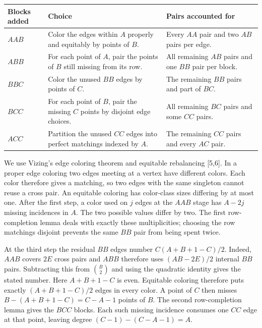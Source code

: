 \documentclass[english,11pt,a4paper]{article}
\begin{document}
{\begin{longtable}[]{@{}
  >{\raggedright\arraybackslash}p{}
  >{\raggedright\arraybackslash}p{}
  >{\raggedright\arraybackslash}p{}@{}}
\toprule\noalign{}
\begin{minipage}[b]{\linewidth}\raggedright
Blocks added
\end{minipage} & \begin{minipage}[b]{\linewidth}\raggedright
Choice
\end{minipage} & \begin{minipage}[b]{\linewidth}\raggedright
Pairs accounted for
\end{minipage} \\
\midrule\noalign{}
\endhead
\bottomrule\noalign{}
\endlastfoot
\(AAB\) & Color the edges within \(A\) properly and equitably by points of \(B\). & Every \(AA\) pair and two \(AB\) pairs per edge. \\
\(ABB\) & For each point of \(A\), pair the points of \(B\) still missing from its row. & All remaining \(AB\) pairs and one \(BB\) pair per block. \\
\(BBC\) & Color the unused \(BB\) edges by points of \(C\). & The remaining \(BB\) pairs and part of \(BC\). \\
\(BCC\) & For each point of \(B\), pair the missing \(C\) points by disjoint edge choices. & All remaining \(BC\) pairs and some \(CC\) pairs. \\
\(ACC\) & Partition the unused \(CC\) edges into perfect matchings indexed by \(A\). & The remaining \(CC\) pairs and every \(AC\) pair. \\
\end{longtable}
}

We use Vizing's edge coloring theorem and equitable rebalancing {[}5,6{]}. In a proper edge coloring two edges meeting at a vertex have different colors. Each color therefore gives a matching, so two edges with the same singleton cannot reuse a cross pair. An equitable coloring has color-class sizes differing by at most one. After the first step, a color used on \(j\) edges at the \(AAB\) stage has \(A-2j\) missing incidences in \(A\). The two possible values differ by two. The first row-completion lemma deals with exactly these multiplicities; choosing the row matchings disjoint prevents the same \(BB\) pair from being spent twice.

At the third step the residual \(BB\) edges number \(C(A+B+1-C)/2\). Indeed, \(AAB\) covers \(2E\) cross pairs and \(ABB\) therefore uses \((AB-2E)/2\) internal \(BB\) pairs. Subtracting this from \(\binom B2\) and using the quadratic identity gives the stated number. Here \(A+B+1-C\) is even. Equitable coloring therefore puts exactly \((A+B+1-C)/2\) edges in every color. A point of \(C\) then misses \(B-(A+B+1-C)=C-A-1\) points of \(B\). The second row-completion lemma gives the \(BCC\) blocks. Each such missing incidence consumes one \(CC\) edge at that point, leaving degree \((C-1)-(C-A-1)=A\).
\end{document}
